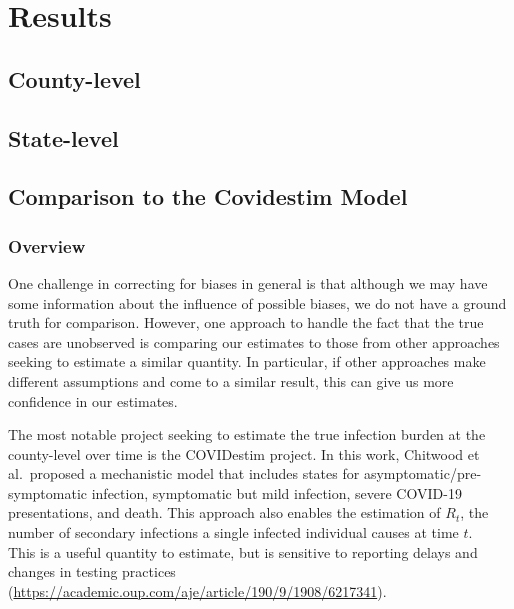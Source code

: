 \documentclass[12pt,twoside]{smiththesis}
\begin{document}
\hypertarget{results}{%
\chapter{Results}\label{results}}

\hypertarget{county-level}{%
\section{County-level}\label{county-level}}

\hypertarget{state-level}{%
\section{State-level}\label{state-level}}

\hypertarget{comparison-to-the-covidestim-model}{%
\section{Comparison to the Covidestim Model}\label{comparison-to-the-covidestim-model}}

\hypertarget{overview-2}{%
\subsection{Overview}\label{overview-2}}

One challenge in correcting for biases in general is that although we may have some information about the influence of possible biases, we do not have a ground truth for comparison. However, one approach to handle the fact that the true cases are unobserved is comparing our estimates to those from other approaches seeking to estimate a similar quantity. In particular, if other approaches make different assumptions and come to a similar result, this can give us more confidence in our estimates.

The most notable project seeking to estimate the true infection burden at the county-level over time is the COVIDestim project. In this work, Chitwood et al.~proposed a mechanistic model that includes states for asymptomatic/pre-symptomatic infection, symptomatic but mild infection, severe COVID-19 presentations, and death. This approach also enables the estimation of \(R_t\), the number of secondary infections a single infected individual causes at time \(t\).\\
This is a useful quantity to estimate, but is sensitive to reporting delays and changes in testing practices (\url{https://academic.oup.com/aje/article/190/9/1908/6217341}).
\end{document}
